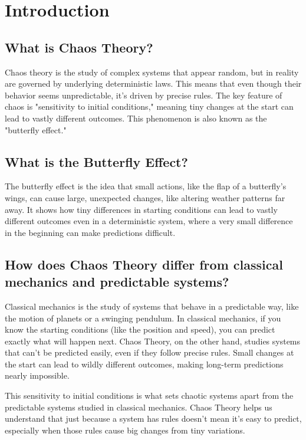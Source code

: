 \documentclass[12pt]{article}
\begin{document}
\section{Introduction}

\subsection{What is Chaos Theory?}
Chaos theory is the study of complex systems that appear random, but in reality are governed by underlying deterministic laws. This means that even though their behavior seems unpredictable, it's driven by precise rules. The key feature of chaos is "sensitivity to initial conditions," meaning tiny changes at the start can lead to vastly different outcomes. This phenomenon is also known as the "butterfly effect."

\subsection{What is the Butterfly Effect?}
The butterfly effect is the idea that small actions, like the flap of a butterfly’s wings, can cause large, unexpected changes, like altering weather patterns far away. It shows how tiny differences in starting conditions can lead to vastly different outcomes even in a deterministic system, where a very small difference in the beginning can make predictions difficult.

\subsection{How does Chaos Theory differ from classical mechanics and predictable systems?}
Classical mechanics is the study of systems that behave in a predictable way, like the motion of planets or a swinging pendulum. In classical mechanics, if you know the starting conditions (like the position and speed), you can predict exactly what will happen next. Chaos Theory, on the other hand, studies systems that can’t be predicted easily, even if they follow precise rules. Small changes at the start can lead to wildly different outcomes, making long-term predictions nearly impossible.

This sensitivity to initial conditions is what sets chaotic systems apart from the predictable systems studied in classical mechanics. Chaos Theory helps us understand that just because a system has rules doesn’t mean it’s easy to predict, especially when those rules cause big changes from tiny variations.
\end{document}
